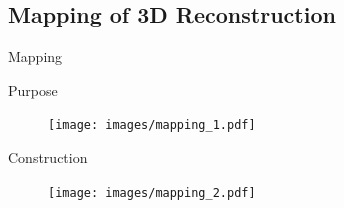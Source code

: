 \documentclass[10pt]{beamer}
\begin{document}
\subsection{Mapping of 3D Reconstruction}
\begin{frame}{Mapping}

\begin{exampleblock}{Purpose}
\end{exampleblock}
\begin{figure}
\centering
\texttt{[image: images/mapping\_1.pdf]}
\end{figure}

\begin{exampleblock}{Construction}
\end{exampleblock}
\begin{figure}
\centering
\texttt{[image: images/mapping\_2.pdf]}
\end{figure}


\end{frame}

\end{document}
